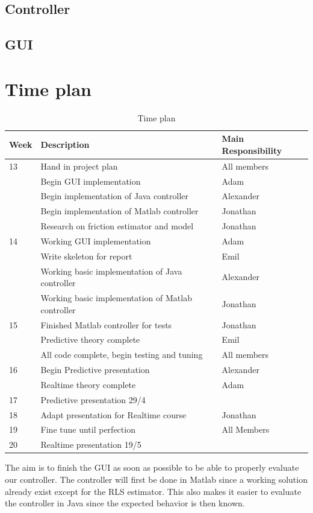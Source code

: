 \documentclass[10pt,a4paper]{article}
\begin{document}





\subsection{Controller}


\subsection{GUI}


\section{Time plan}
\begin{table}[H]
\centering
\caption{Time plan}
\label{hoho}
\begin{tabular}{|l|l|l|}
\hline
Week & Description & Main Responsibility \\ \hline
13 & Hand in project plan & All members \\ \hline
& Begin GUI implementation & Adam \\ \hline
& Begin implementation of Java controller & Alexander \\ \hline
& Begin implementation of Matlab controller & Jonathan \\ \hline
& Research on friction estimator and model & Jonathan \\ \hline
14 & Working GUI implementation & Adam \\ \hline
& Write skeleton for report & Emil \\ \hline
& Working basic implementation of Java controller & Alexander \\ \hline
& Working basic implementation of Matlab controller & Jonathan \\ \hline
15 & Finished Matlab controller for tests & Jonathan \\ \hline
& Predictive theory complete  & Emil \\ \hline
& All code complete, begin testing and tuning & All members \\ \hline
16 & Begin Predictive presentation & Alexander \\ \hline
& Realtime theory complete & Adam \\ \hline
17 & Predictive presentation 29/4 & \\ \hline
18 & Adapt presentation for Realtime course & Jonathan \\ \hline
19 & Fine tune until perfection & All Members \\ \hline
20 & Realtime presentation 19/5  & \\ \hline
\end{tabular}
\end{table}
The aim is to finish the GUI as soon as possible to be able to properly evaluate our controller. The controller will first be done in Matlab since a working solution already exist except for the RLS estimator. This also makes it easier to evaluate the controller in Java since the expected behavior is then known.
\end{document}
